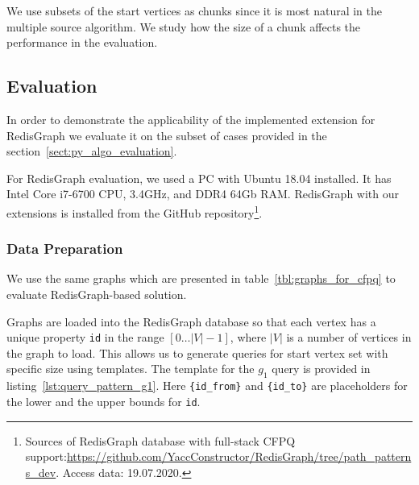 We use subsets of the start vertices as chunks since it is most natural in the multiple source algorithm.
We study how the size of a chunk affects the performance in the evaluation.

\subsection{Evaluation}

In order to demonstrate the applicability of the implemented extension for RedisGraph we evaluate it on the subset of cases provided in the section~\ref{sect:py_algo_evaluation}.

For RedisGraph evaluation, we used a PC with Ubuntu 18.04 installed.
It has Intel Core i7-6700 CPU, 3.4GHz, and DDR4 64Gb RAM.
RedisGraph with our extensions is installed from the GitHub repository\footnote{Sources of RedisGraph database with full-stack CFPQ support:\url{https://github.com/YaccConstructor/RedisGraph/tree/path_patterns_dev}. Access data: 19.07.2020.}.

\subsubsection{Data Preparation}

We use the same graphs which are presented in table~\ref{tbl:graphs_for_cfpq} to evaluate RedisGraph-based solution.

Graphs are loaded into the RedisGraph database so that each vertex has a unique property \verb|id| in the range $[0 \ldots |V|-1]$, where $|V|$ is a number of vertices in the graph to load.
This allows us to generate queries for start vertex set with specific size using templates.
The template for the $g_1$ query is provided in listing~\ref{lst:query_pattern_g1}.
Here \texttt{\{id\_from\}} and \texttt{\{id\_to\}} are placeholders for the lower and the upper bounds for \verb|id|.

\begin{algorithm}
\end{algorithm}

